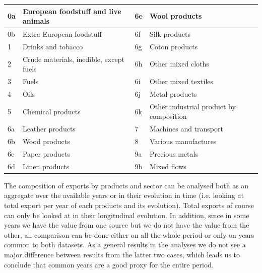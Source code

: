 \documentclass[12pt,a4paper,titlepage,english]{article}
\begin{document}
\begin{table}[!htb]
 \label{tab:title} 
\begin{center}
\begin{tabular}{ | l | l | l | l | }
\hline
	0a & European foodstuff and live animals & 6e & Wool products \\ \hline
	0b & Extra-European foodstuff & 6f & Silk products \\ \hline
	1 & Drinks and tobacco & 6g & Coton products \\ \hline
	2 & Crude materials, inedible, except fuels & 6h & Other mixed cloths \\ \hline
	3 & Fuels & 6i & Other mixed textiles \\ \hline
	4 & Oils & 6j & Metal products \\ \hline
	5 & Chemical products & 6k & Other industrial product by composition \\ \hline
	6a & Leather products & 7 & Machines and transport \\ \hline
	6b & Wood products & 8 & Various manufactures \\ \hline
	6c & Paper products & 9a & Precious metals \\ \hline
	6d & Linen products & 9b & Mixed flows \\ \hline
\end{tabular}
\end{center}
\end{table}

The composition of exports by products and sector can be analysed both as an aggregate over the available years or in their evolution in time (i.e. looking at total export per year of each products and its evolution). Total exports of course can only be looked at in their longitudinal evolution. In addition, since in some years we have the value from one source but we do not have the value from the other, all comparison can be done either on all the whole period or only on years common to both datasets. As a general results in the analyses we do not see a major difference between results from the latter two cases, which leads us to conclude that common years are a good proxy for the entire period. 
\end{document}
